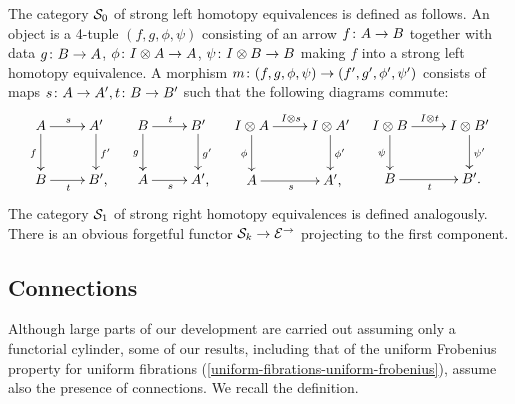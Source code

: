 \documentclass[reqno,10pt,a4paper,oneside,draft]{amsart}
\begin{document}
The category $\cal{S}_0$ of strong left homotopy equivalences is defined as follows.
An object is a 4-tuple $(f, g, \phi, \psi)$ consisting of an arrow $f \co A \to B$ together with data $g \co B \to A$, $\phi \co \interval \otimes A \to A$, $\psi \co \interval \otimes B \to B$ making $f$ into a strong left homotopy equivalence.
A morphism $m \co (f, g, \phi, \psi) \to (f', g', \phi', \psi')$ consists of maps $s \co A \to A', t \co B \to B'$ such that the following diagrams commute:
\begin{align*}
\xymatrix{
  A
  \ar[r]^{s}
  \ar[d]_{f}
&
  A'
  \ar[d]^{f'}
\\
  B
  \ar[r]_{t}
&
  B'\rlap{,}
}
&&
\xymatrix{
  B
  \ar[r]^{t}
  \ar[d]_{g}
&
  B'
  \ar[d]^{g'}
\\
  A
  \ar[r]_{s}
&
  A'\rlap{,}
}
&&
\xymatrix{
  \interval \otimes A
  \ar[d]_{\phi}
  \ar[r]^{\interval \otimes s}
&
  I \otimes A'
  \ar[d]^{\phi'}
\\
  A
  \ar[r]_{s}
&
  A' \rlap{,}
}
&&
\xymatrix{
  \interval \otimes B
  \ar[d]_{\psi}
  \ar[r]^{\interval \otimes t}
&
  I \otimes B'
  \ar[d]^{\psi'}
\\
  B
  \ar[r]_{t}
&
  B' \rlap{.}
}
\end{align*}
The category $\cal{S}_1$ of strong right homotopy equivalences is defined analogously.
There is an obvious forgetful functor $\cal{S}_k \to \catE^\to$ projecting to the first component.

\subsection*{Connections}

Although large parts of our development are carried out assuming only a functorial cylinder, some of our results, including that of the uniform Frobenius property for uniform fibrations (\cref{uniform-fibrations-uniform-frobenius}), assume also the presence of connections.
We recall the definition.
\end{document}
